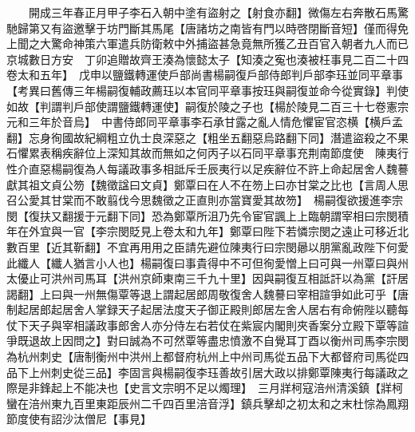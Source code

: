 　　開成三年春正月甲子李石入朝中塗有盜射之【射食亦翻】微傷左右奔散石馬驚馳歸第又有盜邀擊于坊門斷其馬尾【唐諸坊之南皆有門以時啓閉斷音短】僅而得免上聞之大驚命神策六軍遣兵防衛敕中外捕盜甚急竟無所獲乙丑百官入朝者九人而已京城數日方安　丁卯追贈故齊王湊為懷懿太子【知湊之寃也湊被枉事見二百二十四卷太和五年】　戊申以鹽鐵轉運使戶部尚書楊嗣復戶部侍郎判戶部李珏並同平章事　【考異曰舊傳三年楊嗣復輔政薦珏以本官同平章事按珏與嗣復並命今從實錄】判使如故【判謂判戶部使謂鹽鐵轉運使】嗣復於陵之子也【楊於陵見二百三十七卷憲宗元和三年於音烏】　中書侍郎同平章事李石承甘露之亂人情危懼宦官恣横【横戶孟翻】忘身徇國故紀綱粗立仇士良深惡之【粗坐五翻惡烏路翻下同】潛遣盜殺之不果石懼累表稱疾辭位上深知其故而無如之何丙子以石同平章事充荆南節度使　陳夷行性介直惡楊嗣復為人每議政事多相詆斥壬辰夷行以足疾辭位不許上命起居舍人魏謩獻其祖文貞公笏【魏徵諡曰文貞】鄭覃曰在人不在笏上曰亦甘棠之比也【言周人思召公愛其甘棠而不敢翦伐今思魏徵之正直則亦當寶愛其故笏】　楊嗣復欲援進李宗閔【復扶又翻援于元翻下同】恐為鄭覃所沮乃先令宦官諷上上臨朝謂宰相曰宗閔積年在外宜與一官【李宗閔貶見上卷太和九年】鄭覃曰陛下若憐宗閔之遠止可移近北數百里【近其靳翻】不宜再用用之臣請先避位陳夷行曰宗閔曏以朋黨亂政陛下何愛此纖人【纖人猶言小人也】楊嗣復曰事貴得中不可但徇愛憎上曰可與一州覃曰與州太優止可洪州司馬耳【洪州京師東南三千九十里】因與嗣復互相詆訐以為黨【訐居謁翻】上曰與一州無傷覃等退上謂起居郎周敬復舍人魏謩曰宰相諠爭如此可乎【唐制起居郎起居舍人掌録天子起居法度天子御正殿則郎居左舍人居右有命俯陛以聽每仗下天子與宰相議政事郎舍人亦分侍左右若仗在紫宸内閣則夾香案分立殿下覃等諠爭既退故上因問之】對曰誠為不可然覃等盡忠憤激不自覺耳丁酉以衡州司馬李宗閔為杭州刺史【唐制衡州中洪州上都督府杭州上中州司馬從五品下大都督府司馬從四品下上州刺史從三品】李固言與楊嗣復李珏善故引居大政以排鄭覃陳夷行每議政之際是非鋒起上不能决也【史言文宗明不足以燭理】　三月牂柯寇涪州清溪鎮【牂柯蠻在涪州東九百里東距辰州二千四百里涪音浮】鎮兵擊却之初太和之末杜悰為鳳翔節度使有詔沙汰僧尼【事見】

